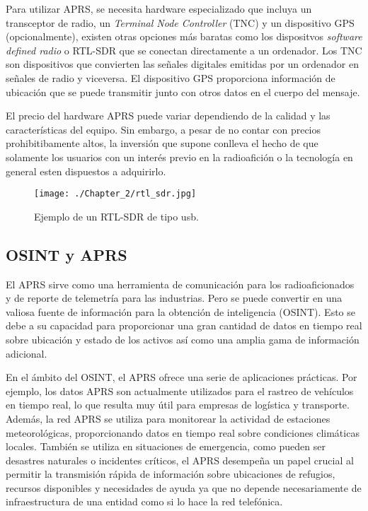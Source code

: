 Para utilizar APRS, se necesita hardware especializado que incluya un transceptor de radio, un \textit{Terminal Node Controller} (TNC) y un dispositivo GPS (opcionalmente), existen otras opciones más baratas como los dispositvos \textit{software defined radio} o RTL-SDR  que se conectan directamente a un ordenador. Los TNC son dispositivos que convierten las señales digitales emitidas por un ordenador en señales de radio y viceversa. El dispositivo GPS proporciona información de ubicación que se puede transmitir junto con otros datos en el cuerpo del mensaje.

El precio del hardware APRS puede variar dependiendo de la calidad y las características del equipo. Sin embargo, a pesar de no contar con precios prohibitibamente altos, la inversión que supone conlleva el hecho de que solamente los usuarios con un interés previo en la radioafición o la tecnología en general esten dispuestos a adquirirlo.

\begin{figure}
    \centering
    \texttt{[image: ./Chapter\_2/rtl\_sdr.jpg]}
    \caption{Ejemplo de un RTL-SDR de tipo usb.}
    \label{fig:rtl-sdr}
\end{figure}


\subsection{OSINT y APRS}

El APRS sirve como una herramienta de comunicación para los radioaficionados y de reporte de telemetría para las industrias. Pero se puede convertir en una valiosa fuente de información para la obtención de inteligencia (OSINT). Esto se debe a su capacidad para proporcionar una gran cantidad de datos en tiempo real sobre ubicación y estado de los activos así como una amplia gama de información adicional.

En el ámbito del OSINT, el APRS ofrece una serie de aplicaciones prácticas. Por ejemplo, los datos APRS son actualmente utilizados para el rastreo de vehículos en tiempo real, lo que resulta muy útil para empresas de logística y transporte. Además, la red APRS se utiliza para monitorear la actividad de estaciones meteorológicas, proporcionando datos en tiempo real sobre condiciones climáticas locales. También se utiliza en situaciones de emergencia, como pueden ser desastres naturales o incidentes críticos, el APRS desempeña un papel crucial al permitir la transmisión rápida de información sobre ubicaciones de refugios, recursos disponibles y necesidades de ayuda ya que no depende necesariamente de infraestructura de una entidad como si lo hace la red telefónica.

